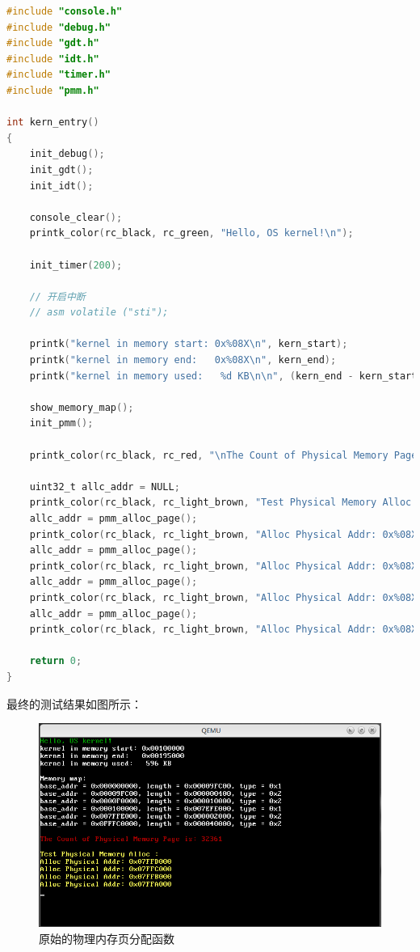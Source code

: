 \begin{lstlisting}[language = C, caption = init/entry.c]
#include "console.h"
#include "debug.h"
#include "gdt.h"
#include "idt.h"
#include "timer.h"
#include "pmm.h"

int kern_entry()
{
	init_debug();
	init_gdt();
	init_idt();

	console_clear();
	printk_color(rc_black, rc_green, "Hello, OS kernel!\n");

	init_timer(200);
	
	// 开启中断
	// asm volatile ("sti");

	printk("kernel in memory start: 0x%08X\n", kern_start);
	printk("kernel in memory end:   0x%08X\n", kern_end);
	printk("kernel in memory used:   %d KB\n\n", (kern_end - kern_start) / 1024);
	
	show_memory_map();
	init_pmm();

	printk_color(rc_black, rc_red, "\nThe Count of Physical Memory Page is: %u\n\n", phy_page_count);

	uint32_t allc_addr = NULL;
	printk_color(rc_black, rc_light_brown, "Test Physical Memory Alloc :\n");
	allc_addr = pmm_alloc_page();
	printk_color(rc_black, rc_light_brown, "Alloc Physical Addr: 0x%08X\n", allc_addr);
	allc_addr = pmm_alloc_page();
	printk_color(rc_black, rc_light_brown, "Alloc Physical Addr: 0x%08X\n", allc_addr);
	allc_addr = pmm_alloc_page();
	printk_color(rc_black, rc_light_brown, "Alloc Physical Addr: 0x%08X\n", allc_addr);
	allc_addr = pmm_alloc_page();
	printk_color(rc_black, rc_light_brown, "Alloc Physical Addr: 0x%08X\n", allc_addr);

	return 0;
}
\end{lstlisting}

\par 最终的测试结果如图所示：

\begin{figure}[ht]
      \centering
      \includegraphics[scale=0.6]{picture/chapt9/PHY_MEM_ALLOC.png}
      \caption{原始的物理内存页分配函数}
\end{figure}

